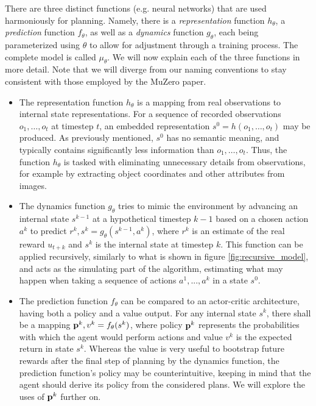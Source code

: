 There are three distinct functions (e.g. neural networks) that are used harmoniously for planning. Namely, there is a \textit{representation} function $h_\theta$, a \textit{prediction} function $f_\theta$, as well as a \textit{dynamics} function $g_\theta$, each being parameterized using $\theta$ to allow for adjustment through a training process. The complete model is called $\mu_\theta$. We will now explain each of the three functions in more detail. Note that we will diverge from our naming conventions to stay consistent with those employed by the MuZero paper.
\begin{itemize}
    \item The representation function $h_\theta$ is a mapping from real observations to internal state representations. For a sequence of recorded observations $o_1, \dots, o_t$ at timestep $t$, an embedded representation $s^0 = h(o_1, \dots, o_t)$ may be produced. As previously mentioned, $s^0$ has no semantic meaning, and typically contains significantly less information than $o_1, \dots, o_t$. Thus, the function $h_\theta$ is tasked with eliminating unnecessary details from observations, for example by extracting object coordinates and other attributes from images.

    \item The dynamics function $g_\theta$ tries to mimic the environment by advancing an internal state $s^{k-1}$ at a hypothetical timestep $k-1$ based on a chosen action $a^k$ to predict $r^k, s^k = g_\theta\left(s^{k-1}, a^k\right)$, where $r^k$ is an estimate of the real reward $u_{t+k}$ and $s^k$ is the internal state at timestep $k$. This function can be applied recursively, similarly to what is shown in figure \ref{fig:recursive_model}, and acts as the simulating part of the algorithm, estimating what may happen when taking a sequence of actions $a^1, ..., a^k$ in a state $s^0$.

    \item The prediction function $f_\theta$ can be compared to an actor-critic architecture, having both a policy and a value output. For any internal state $s^k$, there shall be a mapping $\text{\textbf{p}}^k, v^k = f_\theta(s^k)$, where policy $\text{\textbf{p}}^k$ represents the probabilities with which the agent would perform actions and value $v^k$ is the expected return in state $s^k$. Whereas the value is very useful to bootstrap future rewards after the final step of planning by the dynamics function, the prediction function's policy may be counterintuitive, keeping in mind that the agent should derive its policy from the considered plans. We will explore the uses of $\text{\textbf{p}}^k$ further on.
\end{itemize}

